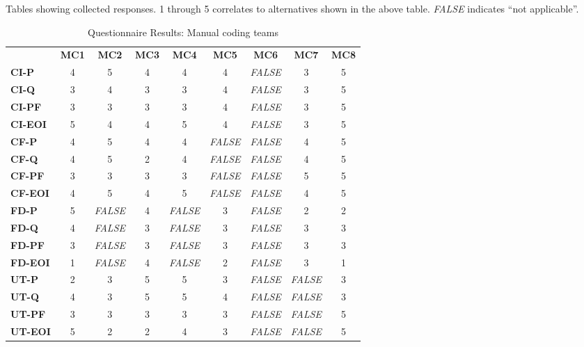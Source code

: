 \documentclass[final_report_innit.tex]{subfiles}
\begin{document}
Tables showing collected responses. 1 through 5 correlates to alternatives shown in the above table. \textit{FALSE} indicates ``not applicable''.

\begin{center}
\begin{table}[h]
\caption{Questionnaire Results: Manual coding teams}
\begin{tabular}[b]{l | c | c | c | c | c | c | c | c}
	& \textbf{MC1} & \textbf{MC2} & \textbf{MC3} & \textbf{MC4} & \textbf{MC5} & \textbf{MC6} & \textbf{MC7} & \textbf{MC8} \\ %
	\textbf{CI-P} & 4 & 5 & 4 & 4 & 4 & \textit{FALSE} & 3 & 5 \\ %
	\textbf{CI-Q} & 3 & 4 & 3 & 3 & 4 & \textit{FALSE} & 3 & 5 \\ %
	\textbf{CI-PF} & 3 & 3 & 3 & 3 & 4 & \textit{FALSE} & 3 & 5 \\ %
	\textbf{CI-EOI} & 5 & 4 & 4 & 5 & 4 & \textit{FALSE} & 3 & 5 \\ %
	\textbf{CF-P} & 4 & 5 & 4 & 4 & \textit{FALSE} & \textit{FALSE} & 4 & 5 \\ %
	\textbf{CF-Q} & 4 & 5 & 2 & 4 & \textit{FALSE} & \textit{FALSE} & 4 & 5 \\ %
	\textbf{CF-PF} & 3 & 3 & 3 & 3 & \textit{FALSE} & \textit{FALSE} & 5 & 5 \\ %
	\textbf{CF-EOI} & 4 & 5 & 4 & 5 & \textit{FALSE} & \textit{FALSE} & 4 & 5 \\ %
	\textbf{FD-P} & 5 & \textit{FALSE} & 4 & \textit{FALSE} & 3 & \textit{FALSE} & 2 & 2 \\ %
	\textbf{FD-Q} & 4 & \textit{FALSE} & 3 & \textit{FALSE} & 3 & \textit{FALSE} & 3 & 3 \\ %
	\textbf{FD-PF} & 3 & \textit{FALSE} & 3 & \textit{FALSE} & 3 & \textit{FALSE} & 3 & 3 \\ %
	\textbf{FD-EOI} & 1 & \textit{FALSE} & 4 & \textit{FALSE} & 2 & \textit{FALSE} & 3 & 1 \\ %
	\textbf{UT-P} & 2 & 3 & 5 & 5 & 3 & \textit{FALSE} & \textit{FALSE} & 3 \\ %
	\textbf{UT-Q} & 4 & 3 & 5 & 5 & 4 & \textit{FALSE} & \textit{FALSE} & 3 \\ %
	\textbf{UT-PF} & 3 & 3 & 3 & 3 & 3 & \textit{FALSE} & \textit{FALSE} & 5 \\ %
	\textbf{UT-EOI} & 5 & 2 & 2 & 4 & 3 & \textit{FALSE} & \textit{FALSE} & 5 \\ %

\end{tabular}
\end{table}
\end{center}
\end{document}
